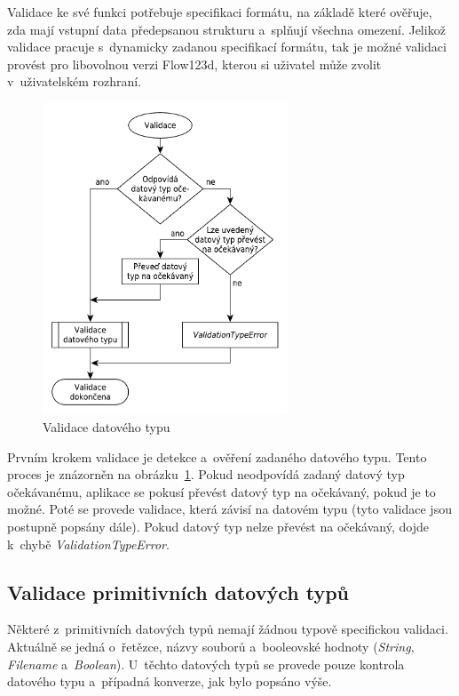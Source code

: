 \documentclass[FM,bw,DP]{tulthesis}
\begin{document}
Validace ke své funkci potřebuje specifikaci formátu, na základě které ověřuje, zda mají vstupní data předepsanou strukturu a~splňují všechna omezení. Jelikož validace pracuje s~dynamicky zadanou specifikací formátu, tak je možné validaci provést pro libovolnou verzi Flow123d, kterou si uživatel může zvolit v~uživatelském rozhraní.

\begin{figure}[h]
	\centering
    \includegraphics[width=0.65\textwidth]{../img/validation_type.pdf}
    \caption{Validace datového typu}
	\label{img:validation_type}
\end{figure}

Prvním krokem validace je detekce a~ověření zadaného datového typu. Tento proces je znázorněn na obrázku~\ref{img:validation_type}. Pokud neodpovídá zadaný datový typ očekávanému, aplikace se pokusí převést datový typ na očekávaný, pokud je to možné. Poté se provede validace, která závisí na datovém typu (tyto validace jsou postupně popsány dále). Pokud datový typ nelze převést na očekávaný, dojde k~chybě \textit{ValidationTypeError}. 

\subsection{Validace primitivních datových typů}

Některé z~primitivních datových typů nemají žádnou typově specifickou validaci. Aktuálně se jedná o~řetězce, názvy souborů a~booleovské hodnoty (\textit{String}, \textit{Filename} a~\textit{Boolean}). U~těchto datových typů se provede pouze kontrola datového typu a~případná konverze, jak bylo popsáno výše.
\end{document}
